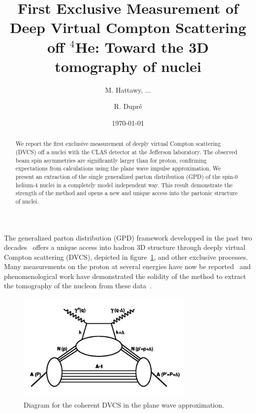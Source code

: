 \documentclass[%
 reprint,
 amsmath,amssymb,
 aps,
]{revtex4-1}
\begin{document}
\title{First Exclusive Measurement of Deep Virtual Compton Scattering off $^4$He: Toward the 3D tomography of nuclei}

\author{M. Hattawy, ...}
\author{R. Dupr\'e}

\date{\today}

\begin{abstract}
We report the first exclusive measurement of deeply virtual Compton scattering 
(DVCS) off a nuclei with the CLAS detector at the Jefferson laboratory. The 
observed beam spin asymmetries are significantly larger than for proton, 
confirming expectations from calculations using the plane wave impulse 
approximation. We present an 
extraction of the single generalized parton distribution (GPD) of the spin-0 
helium-4 nuclei in a completely model independent way. This result demonstrate the 
strength of the method and opens a new and unique access into the partonic structure 
of nuclei.
\end{abstract}


\maketitle


The generalized parton distribution (GPD) framework developped in the past 
two decades~\cite{}
offers a unique access into hadron 3D structure through deeply virtual Compton
scattering (DVCS), depicted in figure~\ref{fig:DVCS}, and other exclusive 
processes. Many measurements on the proton
at several energies have now be reported~\cite{} and phenomenological work
have demonstrated the solidity of the method to extract the tomography of the
nucleon from these data~\cite{}. 

\begin{figure}[htbp]
\caption{\label{fig:DVCS} Diagram for the coherent DVCS in the plane wave approximation.}
\includegraphics[width=8.6cm]{DVCS.png}
\end{figure}
\end{document}
